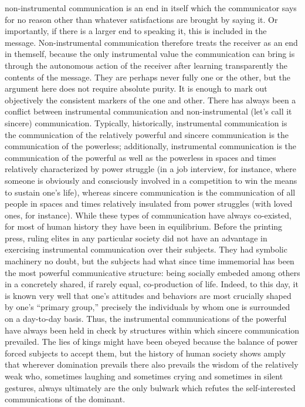 \documentclass[12pt,book]{article}
\begin{document}
non-instrumental communication is an end in itself which the
communicator says for no reason other than whatever satisfactions are
brought by saying it. Or importantly, if there is a larger end to
speaking it, this is included in the message. Non-instrumental
communication therefore treats the receiver as an end in themself,
because the only instrumental value the communication can bring is
through the autonomous action of the receiver after learning
transparently the contents of the message. They are perhaps never fully
one or the other, but the argument here does not require absolute
purity. It is enough to mark out objectively the consistent markers of
the one and other. There has always been a conflict between instrumental
communication and non-instrumental (let's call it sincere)
communication. Typically, historically, instrumental communication is
the communication of the relatively powerful and sincere communication
is the communication of the powerless; additionally, instrumental
communication is the communication of the powerful as well as the
powerless in spaces and times relatively characterized by power struggle
(in a job interview, for instance, where someone is obviously and
consciously involved in a competition to win the means to sustain one's
life), whereas sincere communication is the communication of all people
in spaces and times relatively insulated from power struggles (with
loved ones, for instance). While these types of communication have
always co-existed, for most of human history they have been in
equilibrium. Before the printing press, ruling elites in any particular
society did not have an advantage in exercising instrumental
communication over their subjects. They had symbolic machinery no doubt,
but the subjects had what since time immemorial has been the most
powerful communicative structure: being socially embeded among others in
a concretely shared, if rarely equal, co-production of life. Indeed, to
this day, it is known very well that one's attitudes and behaviors are
most crucially shaped by one's ``primary group,'' precisely the
individuals by whom one is surrounded on a day-to-day basis. Thus, the
instrumental communications of the powerful have always been held in
check by structures within which sincere communication prevailed. The
lies of kings might have been obeyed because the balance of power forced
subjects to accept them, but the history of human society shows amply
that wherever domination prevails there also prevails the wisdom of the
relatively weak who, sometimes laughing and sometimes crying and
sometimes in silent gestures, always ultimately are the only bulwark
which refutes the self-interested communications of the dominant.
\end{document}
